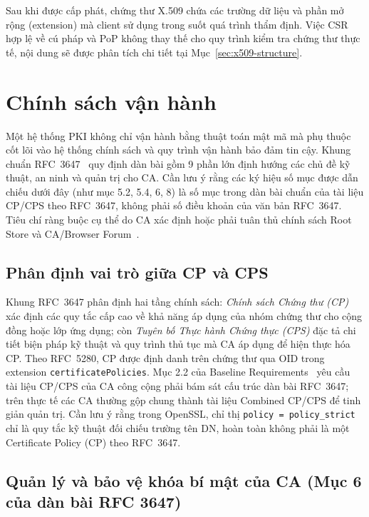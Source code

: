 

Sau khi được cấp phát, chứng thư X.509 chứa các trường dữ liệu và phần mở rộng (extension) mà client sử dụng trong suốt quá trình thẩm định. Việc CSR hợp lệ về cú pháp và PoP không thay thế cho quy trình kiểm tra chứng thư thực tế, nội dung sẽ được phân tích chi tiết tại Mục~\ref{sec:x509-structure}.

\section{Chính sách vận hành}
\label{sec:operating-policy}

Một hệ thống PKI không chỉ vận hành bằng thuật toán mật mã mà phụ thuộc cốt lõi vào hệ thống chính sách và quy trình vận hành bảo đảm tin cậy. Khung chuẩn RFC~3647~\cite{rfc3647} quy định dàn bài gồm 9 phần lớn định hướng các chủ đề kỹ thuật, an ninh và quản trị cho CA. Cần lưu ý rằng các ký hiệu số mục được dẫn chiếu dưới đây (như mục 5.2, 5.4, 6, 8) là số mục trong dàn bài chuẩn của tài liệu CP/CPS theo RFC~3647, không phải số điều khoản của văn bản RFC~3647. Tiêu chí ràng buộc cụ thể do CA xác định hoặc phải tuân thủ chính sách Root Store và CA/Browser Forum~\cite{cabforum_br}.

\subsection{Phân định vai trò giữa CP và CPS}
\label{subsec:cp-vs-cps}

Khung RFC~3647 phân định hai tầng chính sách: \textit{Chính sách Chứng thư (CP)} xác định các quy tắc cấp cao về khả năng áp dụng của nhóm chứng thư cho cộng đồng hoặc lớp ứng dụng; còn \textit{Tuyên bố Thực hành Chứng thực (CPS)} đặc tả chi tiết biện pháp kỹ thuật và quy trình thủ tục mà CA áp dụng để hiện thực hóa CP. Theo RFC~5280, CP được định danh trên chứng thư qua OID trong extension \texttt{certificatePolicies}. Mục 2.2 của Baseline Requirements~\cite{cabforum_br} yêu cầu tài liệu CP/CPS của CA công cộng phải bám sát cấu trúc dàn bài RFC~3647; trên thực tế các CA thường gộp chung thành tài liệu Combined CP/CPS để tinh giản quản trị. Cần lưu ý rằng trong OpenSSL, chỉ thị \texttt{policy = policy\_strict} chỉ là quy tắc kỹ thuật đối chiếu trường tên DN, hoàn toàn không phải là một Certificate Policy (CP) theo RFC~3647.

\subsection{Quản lý và bảo vệ khóa bí mật của CA (Mục 6 của dàn bài RFC 3647)}
\label{subsec:ca-key-protection}

